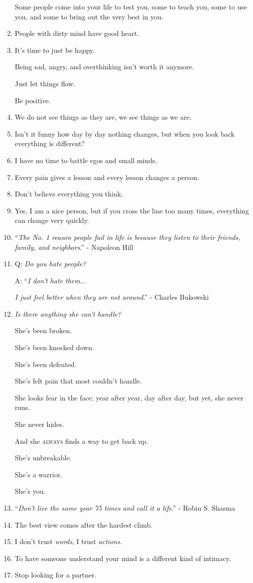 \documentclass{article}
\begin{document}
\begin{enumerate}
	Some people come into your life to test you, some to teach you, some to use you, and some to bring out the very best in you.
	\item People with dirty mind have good heart.
	\item It's time to just be happy.
	
	Being sad, angry, and overthinking isn't worth it anymore.
	
	Just let things flow.
	
	Be positive.
	\item We do not see things as they are, we see things as we are.
	\item Isn't it funny how day by day nothing changes, but when you look back everything is different?
	\item I have no time to battle egos and small minds.
	\item Every pain gives a lesson and every lesson changes a person.
	\item Don't believe everything you think.
	\item Yes, I am a nice person, but if you cross the line too many times, everything can change very quickly.
	\item ``\textit{The No. 1 reason people fail in life is because they listen to their friends, family, and neighbors}.'' - Napoleon Hill
	\item Q: \textit{Do you hate people?}
	
	A: ``\textit{I don't hate them}$\ldots$
	
	\textit{I just feel better when they are not around}.'' - Charles Bukowski
	\item \textit{Is there anything she can't handle?}
	
	She's been broken.
	
	She's been knocked down.
	
	She's been defeated.
	
	She's felt pain that most couldn't handle.
	
	She looks fear in the face; year after year, day after day, but yet, she never runs.
	
	She never hides.
	
	And she \textsc{always} finds a way to get back up.
	
	She's unbreakable.
	
	She's a warrior.
	
	She's you.
	\item ``\textit{Don't live the same year 75 times and call it a life}.'' - Robin S. Sharma
	\item The best view comes after the hardest climb.
	\item I don't trust \textit{words}, I trust \textit{actions}.
	\item To have someone understand your mind is a different kind of intimacy.
	\item Stop looking for a partner.
	

\end{enumerate}
\end{document}
